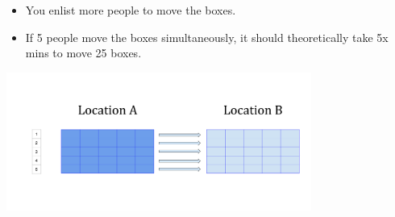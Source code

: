 \documentclass[10pt,t]{beamer}
\begin{document}
\begin{frame}
  \vspace{1cm}
  \begin{itemize}
  \item You enlist more people to move the boxes.
  \item If 5 people move the boxes simultaneously, it should theoretically take 5x mins to move 25 boxes.
  \end{itemize}
  \vspace{-0.9cm}
  \begin{center}
    \includegraphics[width=0.75\textwidth,clip=true]{./Parallel}
    \vspace{-0.8cm}
  \end{center}
\end{frame}
\end{document}

